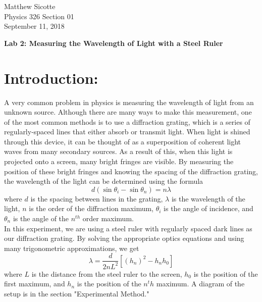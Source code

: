 \documentclass[leqno]{article}
\begin{document}
\begin{flushright}
Matthew Sicotte\\
Physics 326 Section 01\\
September 11, 2018
\end{flushright}
\begin{center}
	{\large \bf Lab 2: Measuring the Wavelength of Light with a Steel Ruler}
\end{center}
\section*{Introduction:}
A very common problem in physics is measuring the wavelength of light from an unknown source.  Although there are many ways to make this measurement, one of the most common methods is to use a diffraction grating, which is a series of regularly-spaced lines that either absorb or transmit light.  When light is shined through this device, it can be thought of as a superposition of coherent light waves from many secondary sources.  As a result of this, when this light is projected onto a screen, many bright fringes are visible.  By measuring the position of these bright fringes and knowing the spacing of the diffraction grating, the wavelength of the light can be determined using the formula
\begin{equation}
	d(\sin{\theta_i}-\sin{\theta_n})=n\lambda
\end{equation}
where $d$ is the spacing between lines in the grating, $\lambda$ is the wavelength of the light, $n$ is the order of the diffraction maximum, $\theta_i$ is the angle of incidence, and $\theta_n$ is the angle of the $n^{th}$ order maximum.\\

\noindent In this experiment, we are using a steel ruler with regularly spaced dark lines as our diffraction grating.  By solving the appropriate optics equations and using many trigonometric approximations, we get
\begin{equation}
	\lambda=\frac{d}{2nL^2}[(h_n)^2-h_n h_0]
\end{equation}
where $L$ is the distance from the steel ruler to the screen, $h_0$ is the position of the first maximum, and $h_n$ is the position of the $n^th$ maximum.
A diagram of the setup is in the section "Experimental Method."\\
\end{document}
